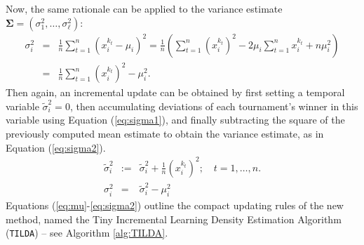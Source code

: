 \documentclass{sig-alternate}
\newcommand{\bsigma}{{\boldsymbol \Sigma}}
\newcommand{\TILDA}{\texttt{TILDA}}
\begin{document}
Now, the same rationale can be applied to the variance estimate $\bsigma=(\sigma_1^2, \ldots, \sigma_\ell^2)$: 
\begin{eqnarray}
\sigma_i^2 &=& \frac{1}{n} \sum_{t=1}^n (x^{k_t}_i-\mu_i)^2 = \frac{1}{n} \left( \sum_{t=1}^n (x^{k_t}_i)^2 - 2\mu_i \sum_{t=1}^n x^{k_t}_i + n \mu_i^2 \right) \nonumber \\
&=& \frac{1}{n} \sum_{t=1}^n (x^{k_t}_i)^2 - \mu_i^2. \label{eq:sigma0} \nonumber
\end{eqnarray}
Then again, an incremental update can be obtained by first setting a temporal variable $\tilde{\sigma}_i^2=0$, then accumulating deviations of each tournament's winner in this variable using Equation (\ref{eq:sigma1}), and finally subtracting the square of the previously computed mean estimate to obtain the variance estimate, as in Equation (\ref{eq:sigma2}). 
\begin{eqnarray}
\tilde{\sigma}_i^2 &:=& \tilde{\sigma}_i^2+\tfrac{1}{n} (x_i^{k_t})^2; \quad t=1,\ldots,n. \label{eq:sigma1} \\
\sigma_i^2 &=& \tilde{\sigma}_i^2-\mu_i^2 \label{eq:sigma2}
\end{eqnarray}
Equations (\ref{eq:mu}-\ref{eq:sigma2}) outline the compact updating rules of the new method, named the Tiny Incremental Learning Density Estimation Algorithm (\TILDA) -- see Algorithm \ref{alg:TILDA}.  
 
\end{document}
